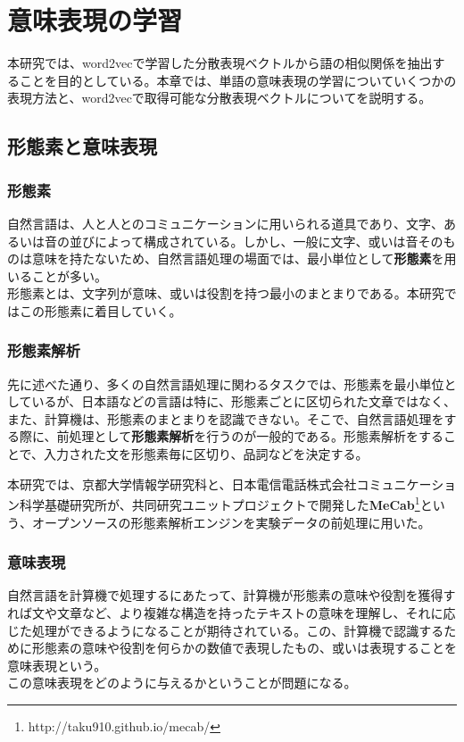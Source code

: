 \chapter{意味表現の学習}
本研究では、word2vecで学習した分散表現ベクトルから語の相似関係を抽出することを目的としている。本章では、単語の意味表現の学習についていくつかの表現方法と、word2vecで取得可能な分散表現ベクトルについてを説明する。

\section{形態素と意味表現}
\subsection{形態素}
自然言語は、人と人とのコミュニケーションに用いられる道具であり、文字、あるいは音の並びによって構成されている。しかし、一般に文字、或いは音そのものは意味を持たないため、自然言語処理の場面では、最小単位として\textbf{形態素}を用いることが多い。\\
形態素とは、文字列が意味、或いは役割を持つ最小のまとまりである。本研究ではこの形態素に着目していく。

\subsection{形態素解析}
先に述べた通り、多くの自然言語処理に関わるタスクでは、形態素を最小単位としているが、日本語などの言語は特に、形態素ごとに区切られた文章ではなく、また、計算機は、形態素のまとまりを認識できない。そこで、自然言語処理をする際に、前処理として\textbf{形態素解析}を行うのが一般的である。形態素解析をすることで、入力された文を形態素毎に区切り、品詞などを決定する。

本研究では、京都大学情報学研究科と、日本電信電話株式会社コミュニケーション科学基礎研究所が、共同研究ユニットプロジェクトで開発した\textbf{MeCab}\footnote{http://taku910.github.io/mecab/}\cite{mecab}という、オープンソースの形態素解析エンジンを実験データの前処理に用いた。

\subsection{意味表現}
自然言語を計算機で処理するにあたって、計算機が形態素の意味や役割を獲得すれば文や文章など、より複雑な構造を持ったテキストの意味を理解し、それに応じた処理ができるようになることが期待されている。この、計算機で認識するために形態素の意味や役割を何らかの数値で表現したもの、或いは表現することを意味表現という。\\
この意味表現をどのように与えるかということが問題になる。


